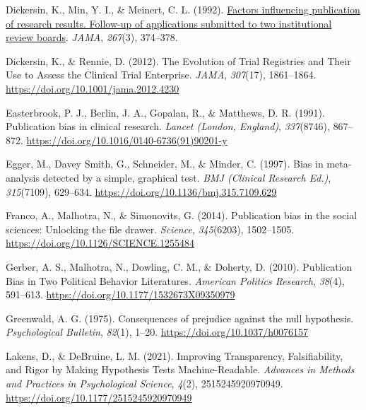 \documentclass[
  ,jou, a4paper,floatsintext]{apa6}
\newlength{\cslhangindent}
\newlength{\cslentryspacingunit} %
\newenvironment{CSLReferences}[2] %
 {%
  \setlength{\parindent}{0pt}
  \ifodd #1
  \let\oldpar\par
  \def\par{\hangindent=\cslhangindent\oldpar}
  \fi
  \setlength{\parskip}{#2\cslentryspacingunit}
 }%
 {}
\begin{document}
\begin{CSLReferences}{1}{0}
\leavevmode{}%
Dickersin, K., Min, Y. I., \& Meinert, C. L. (1992). \href{https://www.ncbi.nlm.nih.gov/pubmed/1727960}{Factors influencing publication of research results. {Follow-up} of applications submitted to two institutional review boards}. \emph{JAMA}, \emph{267}(3), 374--378.

\leavevmode{}%
Dickersin, K., \& Rennie, D. (2012). The {Evolution} of {Trial Registries} and {Their Use} to {Assess} the {Clinical Trial Enterprise}. \emph{JAMA}, \emph{307}(17), 1861--1864. \url{https://doi.org/10.1001/jama.2012.4230}

\leavevmode{}%
Easterbrook, P. J., Berlin, J. A., Gopalan, R., \& Matthews, D. R. (1991). Publication bias in clinical research. \emph{Lancet (London, England)}, \emph{337}(8746), 867--872. \url{https://doi.org/10.1016/0140-6736(91)90201-y}

\leavevmode{}%
Egger, M., Davey Smith, G., Schneider, M., \& Minder, C. (1997). Bias in meta-analysis detected by a simple, graphical test. \emph{BMJ (Clinical Research Ed.)}, \emph{315}(7109), 629--634. \url{https://doi.org/10.1136/bmj.315.7109.629}

\leavevmode{}%
Franco, A., Malhotra, N., \& Simonovits, G. (2014). Publication bias in the social sciences: {Unlocking} the file drawer. \emph{Science}, \emph{345}(6203), 1502--1505. \url{https://doi.org/10.1126/SCIENCE.1255484}

\leavevmode{}%
Gerber, A. S., Malhotra, N., Dowling, C. M., \& Doherty, D. (2010). Publication {Bias} in {Two Political Behavior Literatures}. \emph{American Politics Research}, \emph{38}(4), 591--613. \url{https://doi.org/10.1177/1532673X09350979}

\leavevmode{}%
Greenwald, A. G. (1975). Consequences of prejudice against the null hypothesis. \emph{Psychological Bulletin}, \emph{82}(1), 1--20. \url{https://doi.org/10.1037/h0076157}

\leavevmode{}%
Lakens, D., \& DeBruine, L. M. (2021). Improving {Transparency}, {Falsifiability}, and {Rigor} by {Making Hypothesis Tests Machine-Readable}. \emph{Advances in Methods and Practices in Psychological Science}, \emph{4}(2), 2515245920970949. \url{https://doi.org/10.1177/2515245920970949}


\end{CSLReferences}
\end{document}
